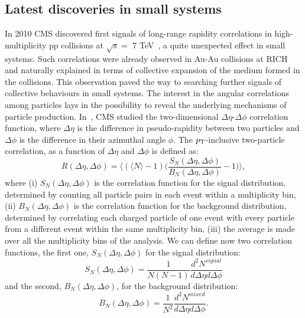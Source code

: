 \subsection{Latest discoveries in small systems}
\label{sec:SmallSystems}
In 2010 CMS discovered first signals of long-range rapidity correlations in 
high-multiplicity pp collisions at $\sqrt{s} = $ 7 TeV~\cite{Khachatryan:2010gv}, a quite unexpected effect 
in small systems. Such correlations
were already observed in Au-Au collisions at RICH~\cite{Alver:2008aa,Alver:2009id,Abelev:2009jv}
and naturally explained in terms of collective expansion of the medium formed in the collisions.
This observation paved the way to searching further signals of collective 
behaviours in small systems. 
The interest in the angular correlations among particles lays in the possibility 
to reveal the underlying mechanisms of particle production. In~\cite{Khachatryan:2010gv}, 
CMS studied the two-dimensional $\Delta \eta$-$\Delta \phi$ correlation 
function, where $\Delta \eta$ is the difference in pseudo-rapidity between 
two particles and $\Delta \phi$ is the difference in their azimuthal angle $\phi$. The $p_{\rm T}$-inclusive two-particle 
correlation, as a function of $\Delta \eta$ and $\Delta \phi$ is defined as:
\begin{equation}
\label{CorrelationFnc}
R(\Delta \eta,\Delta \phi) = \Big \langle (\langle N \rangle -1) \Big (\frac{S_N(\Delta \eta,\Delta \phi)}{B_N(\Delta \eta,\Delta \phi)} -1\Big )\Big \rangle,
\end{equation}
where (i) $S_N(\Delta \eta,\Delta \phi)$ is the correlation function for the signal distribution,
determined by counting all particle pairs in each event within a multiplicity bin, 
(ii) $B_N(\Delta \eta,\Delta \phi)$ is the correlation function for the background distribution, determined
  by correlating each charged particle of one event with every particle from 
a different event within the same multiplicity bin, (iii) the average is made over all the multiplicity bins of the analysis.
\iffalse
We can define now two correlation functions, the first one, $S_N(\Delta \eta,\Delta \phi)$ for the signal distribution:
\begin{equation}
\label{SignalDistribution}
S_N(\Delta \eta,\Delta \phi) = \frac{1}{N(N-1)}\frac{d^2N^{signal}}{d\Delta \eta d\Delta \phi}
\end{equation}
and the second, $B_N(\Delta \eta,\Delta \phi)$, for the background distribution:
\begin{equation}
\label{BkgDistribution}
B_N(\Delta \eta,\Delta \phi) = \frac{1}{N^2}\frac{d^2N^{mixed}}{d\Delta \eta d\Delta \phi}.
\end{equation}
